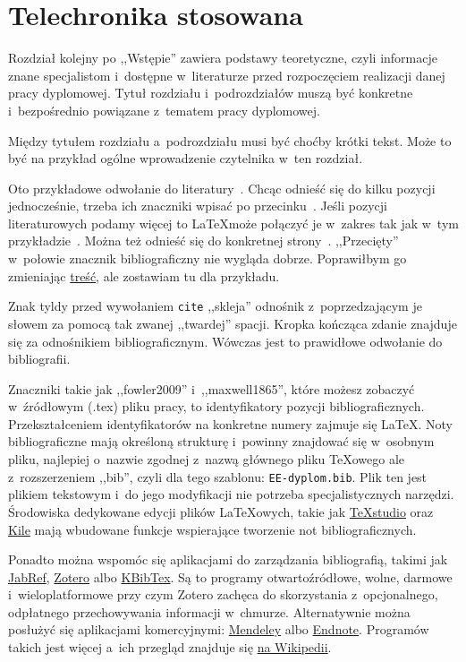 \chapter{Telechronika stosowana}

Rozdział kolejny po ,,Wstępie'' zawiera podstawy teoretyczne, czyli informacje znane specjalistom i~dostępne w~literaturze przed rozpoczęciem realizacji danej pracy dyplomowej. Tytuł rozdziału i~podrozdziałów muszą być konkretne i~bezpośrednio powiązane z~tematem pracy dyplomowej.

Między tytułem rozdziału a~podrozdziału musi być choćby krótki tekst. Może to być na przykład ogólne wprowadzenie czytelnika w~ten rozdział.

Oto przykładowe odwołanie do literatury~\cite{fowler2009}. Chcąc odnieść się do kilku pozycji jednocześnie, trzeba ich znaczniki wpisać po przecinku~\cite{maxwell1865,leksinski1995}. Jeśli pozycji literaturowych podamy więcej to \LaTeX może połączyć je w~zakres tak jak w~tym przykładzie~\cite{fowler2009, maxwell1865, leksinski1995}. Można też odnieść się do konkretnej strony~\cite[s.~38]{leksinski1995}. ,,Przecięty'' w~połowie znacznik bibliograficzny nie wygląda dobrze. Poprawiłbym go zmieniając \underline{treść}, ale zostawiam tu dla przykładu.

Znak tyldy przed wywołaniem \texttt{cite} ,,skleja'' odnośnik z~poprzedzającym je słowem za pomocą tak zwanej ,,twardej'' spacji. Kropka kończąca zdanie znajduje się za odnośnikiem bibliograficznym. Wówczas jest to prawidłowe odwołanie do bibliografii.

Znaczniki takie jak ,,fowler2009'' i~,,maxwell1865'', które możesz zobaczyć w~źródłowym (.tex) pliku pracy, to identyfikatory pozycji bibliograficznych. Przekształceniem identyfikatorów na konkretne numery zajmuje się \LaTeX{}. Noty bibliograficzne mają określoną strukturę i~powinny znajdować się w~osobnym pliku, najlepiej o~nazwie zgodnej z~nazwą głównego pliku \TeX{owego} ale z~rozszerzeniem ,,bib'', czyli dla tego szablonu: \texttt{EE-dyplom.bib}. Plik ten jest plikiem tekstowym i~do jego modyfikacji nie potrzeba specjalistycznych narzędzi. Środowiska dedykowane edycji plików \LaTeX{owych}, takie jak \href{https://www.texstudio.org/}{TeXstudio} oraz \href{https://kile.sourceforge.io/}{Kile} mają wbudowane funkcje wspierające tworzenie not bibliograficznych.

Ponadto można wspomóc się aplikacjami do zarządzania bibliografią, takimi jak \href{https://www.jabref.org/}{JabRef}, \href{https://www.zotero.org/}{Zotero} albo \href{https://userbase.kde.org/KBibTeX}{KBibTex}. Są to programy otwartoźródłowe, wolne, darmowe i~wieloplatformowe przy czym Zotero zachęca do skorzystania z~opcjonalnego, odpłatnego przechowywania informacji w~chmurze. Alternatywnie można posłużyć się aplikacjami komercyjnymi: \href{https://www.mendeley.com/}{Mendeley} albo \href{https://endnote.com/}{Endnote}. Programów takich jest więcej a~ich przegląd znajduje się \href{https://en.wikipedia.org/wiki/Comparison_of_reference_management_software}{na Wikipedii}.

